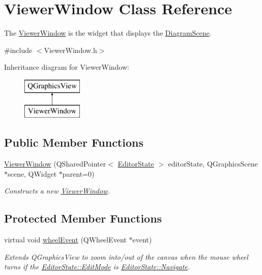 \hypertarget{class_viewer_window}{\section{Viewer\-Window Class Reference}
\label{class_viewer_window}
}


The \hyperlink{class_viewer_window}{Viewer\-Window} is the widget that displays the \hyperlink{class_diagram_scene}{Diagram\-Scene}.  




{\ttfamily \#include $<$Viewer\-Window.\-h$>$}

Inheritance diagram for Viewer\-Window\-:\begin{figure}[H]
\begin{center}
\leavevmode
\includegraphics[height=2.000000cm]{class_viewer_window}
\end{center}
\end{figure}
\subsection*{Public Member Functions}
\begin{DoxyCompactItemize}
\item 
\hyperlink{class_viewer_window_adfafdb32442c61f1cae5e0ef2dc0c669}{Viewer\-Window} (Q\-Shared\-Pointer$<$ \hyperlink{class_editor_state}{Editor\-State} $>$ editor\-State, Q\-Graphics\-Scene $\ast$scene, Q\-Widget $\ast$parent=0)
\begin{DoxyCompactList}\small\item\em Constructs a new \hyperlink{class_viewer_window}{Viewer\-Window}. \end{DoxyCompactList}\end{DoxyCompactItemize}
\subsection*{Protected Member Functions}
\begin{DoxyCompactItemize}
\item 
\hypertarget{class_viewer_window_adf9ad10474494224ee894bf82b5dd046}{virtual void \hyperlink{class_viewer_window_adf9ad10474494224ee894bf82b5dd046}{wheel\-Event} (Q\-Wheel\-Event $\ast$event)}\label{class_viewer_window_adf9ad10474494224ee894bf82b5dd046}

\begin{DoxyCompactList}\small\item\em Extends Q\-Graphics\-View to zoom into/out of the canvas when the mouse wheel turns if the \hyperlink{class_editor_state_a30123e595784b2228edc2a0c2b46ab28}{Editor\-State\-::\-Edit\-Mode} is \hyperlink{class_editor_state_a30123e595784b2228edc2a0c2b46ab28a3ba8f119a9df84447a32145998ec62dd}{Editor\-State\-::\-Navigate}. \end{DoxyCompactList}\end{DoxyCompactItemize}


